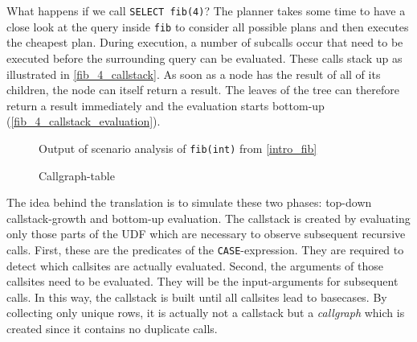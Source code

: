 What happens if we call \texttt{SELECT fib(4)}? The planner takes some time to have a close look at the query inside \texttt{fib} to consider all possible plans and then executes the cheapest plan. During execution, a number of subcalls occur that need to be executed before the surrounding query can be evaluated. These calls stack up as illustrated in \autoref{fib_4_callstack}. As soon as a node has the result of all of its children, the node can itself return a result. The leaves of the tree can therefore return a result immediately and the evaluation starts bottom-up (\autoref{fib_4_callstack_evaluation}). 


\begin{figure}[h!]
    \begin{minipage}[b]{.38\linewidth}
    \centering\large
    \label{intro_fib}
    \end{minipage}\hfill
    \begin{minipage}[b]{.5\linewidth}
    \centering\small
    
    \label{fib_rec_scenarios}
    \end{minipage}
    \caption{Output of scenario analysis of \texttt{fib(int)} from \autoref{intro_fib}}\label{fib_analysis_output}
\end{figure}


\begin{figure}[h]
\centering

\caption{Callgraph-table}\label{tbl:callgraph}
\end{figure}

The idea behind the translation is to simulate these two phases: top-down callstack-growth and bottom-up evaluation. The callstack is created by evaluating only those parts of the UDF which are necessary to observe subsequent recursive calls. First, these are the predicates of the \texttt{CASE}-expression. They are required to detect which callsites are actually evaluated. Second, the arguments of those callsites need to be evaluated. They will be the input-arguments for subsequent calls. In this way, the callstack is built until all callsites lead to basecases. By collecting only unique rows, it is actually not a callstack but a \textit{callgraph} which is created since it contains no duplicate calls.



